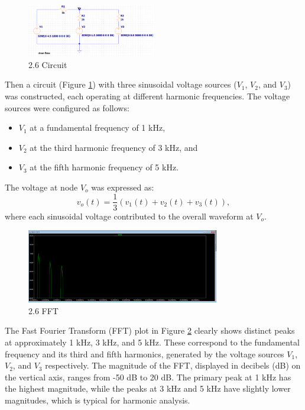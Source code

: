 \documentclass{article}
\begin{document}
\begin{figure}[H]
	\centering
	\includegraphics[width=0.5\textwidth]{26circuit.png}
	\caption{2.6 Circuit}
	\label{fig:fig6}
\end{figure}


Then a circuit (Figure \ref{fig:fig6}) with three sinusoidal voltage sources
(\(V_1\), \(V_2\), and \(V_3\)) was constructed, each operating at different
harmonic frequencies. The voltage sources were configured as follows:
\begin{itemize} \item \(V_1\) at a fundamental frequency of 1 kHz, \item \(V_2\)
at the third harmonic frequency of 3 kHz, and \item \(V_3\) at the fifth
harmonic frequency of 5 kHz. \end{itemize} The voltage at node \(V_o\) was
expressed as: \[ v_o(t) = \frac{1}{3}(v_1(t) + v_2(t) + v_3(t)), \] where each
sinusoidal voltage contributed to the overall waveform at \(V_o\).
\newline

\begin{figure}[H]
	\centering
	\includegraphics[width=0.75\textwidth]{Copy of Lab 4 - 2.6.PNG}
	\caption{2.6 FFT}
	\label{fig:fig7}
\end{figure}

The Fast Fourier Transform (FFT) plot in Figure \ref{fig:fig7} clearly shows distinct peaks at 
approximately 1 kHz, 3 kHz, and 5 kHz. These correspond to the fundamental frequency and its third 
and fifth harmonics, generated by the voltage sources \(V_1\), \(V_2\), and \(V_3\) respectively. 
The magnitude of the FFT, displayed in decibels (dB) on the vertical axis, ranges from -50 dB to 20 dB. 
The primary peak at 1 kHz has the highest magnitude, while the peaks at 3 kHz and 5 kHz have slightly lower 
magnitudes, which is typical for harmonic analysis.
\newline
\end{document}
